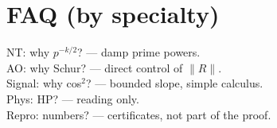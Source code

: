 \section{FAQ (by specialty)}
NT: why $p^{-k/2}$? — damp prime powers. \\
AO: why Schur? — direct control of $\|R\|$. \\
Signal: why cos$^2$? — bounded slope, simple calculus. \\
Phys: HP? — reading only. \\
Repro: numbers? — certificates, not part of the proof.
